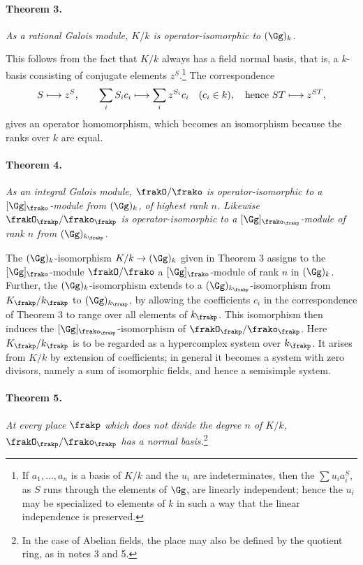 \paragraph{Theorem 3.}
\emph{As a rational Galois module, \(K/k\) is operator-isomorphic to \((\Gg)_k\).}

This follows from the fact that \(K/k\) always has a field normal basis, that is, a \(k\)-basis consisting of conjugate elements \(z^S\).\footnote{If \(a_1,\ldots,a_n\) is a basis of \(K/k\) and the \(u_i\) are indeterminates, then the \(\sum u_i a_i^S\), as \(S\) runs through the elements of \(\Gg\), are linearly independent; hence the \(u_i\) may be specialized to elements of \(k\) in such a way that the linear independence is preserved.} The correspondence
\[
        S\longmapsto z^S,
        \qquad
        \sum_i S_i c_i\longmapsto \sum_i z^{S_i}c_i
        \quad(c_i\in k),
        \quad\hbox{hence } ST\longmapsto z^{ST},
\]
gives an operator homomorphism, which becomes an isomorphism because the ranks over \(k\) are equal.

\paragraph{Theorem 4.}
\emph{As an integral Galois module, \(\frakO/\frako\) is operator-isomorphic to a \([\Gg]_\frako\)-module from \((\Gg)_k\), of highest rank \(n\). Likewise \(\frakO_\frakp/\frako_\frakp\) is operator-isomorphic to a \([\Gg]_{\frako_\frakp}\)-module of rank \(n\) from \((\Gg)_{k_\frakp}\).}

The \((\Gg)_k\)-isomorphism \(K/k\to(\Gg)_k\) given in Theorem 3 assigns to the \([\Gg]_\frako\)-module \(\frakO/\frako\) a \([\Gg]_\frako\)-module of rank \(n\) in \((\Gg)_k\). Further, the \((\Gg)_k\)-isomorphism extends to a \((\Gg)_{k_\frakp}\)-isomorphism from \(K_\frakp/k_\frakp\) to \((\Gg)_{k_\frakp}\), by allowing the coefficients \(c_i\) in the correspondence of Theorem 3 to range over all elements of \(k_\frakp\). This isomorphism then induces the \([\Gg]_{\frako_\frakp}\)-isomorphism of \(\frakO_\frakp/\frako_\frakp\). Here \(K_\frakp/k_\frakp\) is to be regarded as a hypercomplex system over \(k_\frakp\). It arises from \(K/k\) by extension of coefficients; in general it becomes a system with zero divisors, namely a sum of isomorphic fields, and hence a semisimple system.

\paragraph{Theorem 5.}
\emph{At every place \(\frakp\) which does not divide the degree \(n\) of \(K/k\), \(\frakO_\frakp/\frako_\frakp\) has a normal basis.}\footnote{In the case of Abelian fields, the place may also be defined by the quotient ring, as in notes 3 and 5.}

